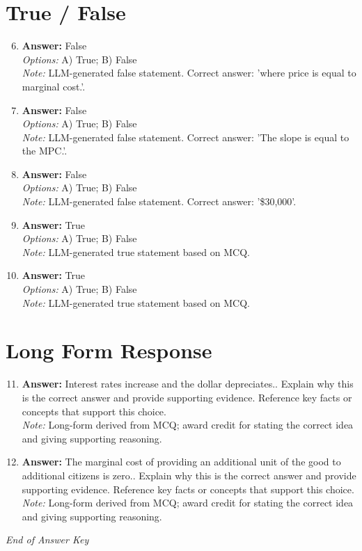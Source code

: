 \documentclass[12pt]{article}
\begin{document}
\section*{True / False}
\begin{enumerate}[label=\arabic*.]
\setcounter{enumi}{5}
\item \textbf{Answer:} False
\\ \textit{Options:} A) True; B) False
\\ \textit{Note:} LLM-generated false statement. Correct answer: 'where price is equal to marginal cost.'.
\item \textbf{Answer:} False
\\ \textit{Options:} A) True; B) False
\\ \textit{Note:} LLM-generated false statement. Correct answer: 'The slope is equal to the MPC.'.
\item \textbf{Answer:} False
\\ \textit{Options:} A) True; B) False
\\ \textit{Note:} LLM-generated false statement. Correct answer: '\$30,000'.
\item \textbf{Answer:} True
\\ \textit{Options:} A) True; B) False
\\ \textit{Note:} LLM-generated true statement based on MCQ.
\item \textbf{Answer:} True
\\ \textit{Options:} A) True; B) False
\\ \textit{Note:} LLM-generated true statement based on MCQ.
\end{enumerate}

\section*{Long Form Response}
\begin{enumerate}[label=\arabic*.]
\setcounter{enumi}{10}
\item \textbf{Answer:} Interest rates increase and the dollar depreciates.. Explain why this is the correct answer and provide supporting evidence. Reference key facts or concepts that support this choice.
\\ \textit{Note:} Long-form derived from MCQ; award credit for stating the correct idea and giving supporting reasoning.
\item \textbf{Answer:} The marginal cost of providing an additional unit of the good to additional citizens is zero.. Explain why this is the correct answer and provide supporting evidence. Reference key facts or concepts that support this choice.
\\ \textit{Note:} Long-form derived from MCQ; award credit for stating the correct idea and giving supporting reasoning.
\end{enumerate}

\vfill
\noindent\textit{End of Answer Key}
\end{document}
